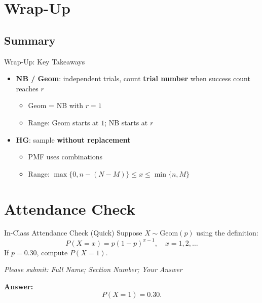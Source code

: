 \documentclass{beamer}
\begin{document}
\section{Wrap-Up}

\subsection{Summary}

\begin{frame}{Wrap-Up: Key Takeaways}
\begin{itemize}
  \item \textbf{NB / Geom}: independent trials, count \textbf{trial number} when success count reaches $r$
  \begin{itemize}
    \item Geom = NB with $r=1$
    \item Range: Geom starts at $1$; NB starts at $r$
  \end{itemize}
  \item \textbf{HG}: sample \textbf{without replacement}
  \begin{itemize}
    \item PMF uses combinations
    \item Range: $\max\{0,n-(N-M)\}\le x \le \min\{n,M\}$
  \end{itemize}
\end{itemize}
\end{frame}

\section{Attendance Check}

\begin{frame}{In-Class Attendance Check (Quick)}
Suppose $X\sim \mathrm{Geom}(p)$ using the definition:
\[
P(X=x)=p(1-p)^{x-1},\quad x=1,2,\dots
\]
If $p=0.30$, compute $P(X=1)$.

\vspace{3mm}
\textit{Please submit: Full Name; Section Number; Your Answer}

\pause
\vspace{2mm}
\textbf{Answer:}
\[
P(X=1)=0.30.
\]
\end{frame}
\end{document}
